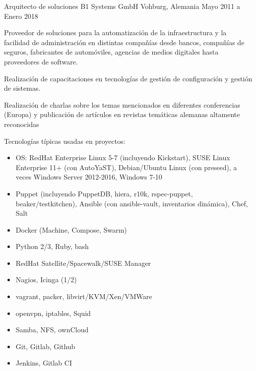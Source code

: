\begin{cventries}

  \cventry
  {Arquitecto de soluciones}
  {B1 Systems GmbH} %
  {Vohburg, Alemania} %
  {Mayo 2011 a Enero 2018} %
    {
      \begin{cvitems} %
      \item Proveedor de soluciones para la automatización de la infraestructura y la facilidad de
      administración en distintas compañías desde bancos, compañías de seguros, fabricantes de
      automóviles, agencias de medios digitales hasta proveedores de software.
      \item Realización de capacitaciones en tecnologías de gestión de configuración y gestión de sistemas.
      \item Realización de charlas sobre los temas mencionados en diferentes conferencias (Europa) y
      publicación de artículos en revistas temáticas alemanas altamente reconocidas
      \item Tecnologías típicas usadas en proyectos:
          \begin{itemize}
            \item OS: RedHat Enterprise Linux 5-7 (incluyendo Kickstart), SUSE Linux Enterprise 11+ (con AutoYaST), Debian/Ubuntu Linux (con preseed), a veces Windows Server 2012-2016, Windows 7-10
            \item Puppet (incluyendo PuppetDB, hiera, r10k, rspec-puppet, beaker/testkitchen), Ansible (con ansible-vault, inventarios dinámica), Chef, Salt
            \item Docker (Machine, Compose, Swarm)
            \item Python 2/3, Ruby, bash
            \item RedHat Satellite/Spacewalk/SUSE Manager
            \item Nagios, Icinga (1/2)
            \item vagrant, packer, libvirt/KVM/Xen/VMWare
            \item openvpn, iptables, Squid
            \item Samba, NFS, ownCloud
            \item Git, Gitlab, Github
            \item Jenkins, Gitlab CI
          \end{itemize}
      \end{cvitems}
    }


\end{cventries}
